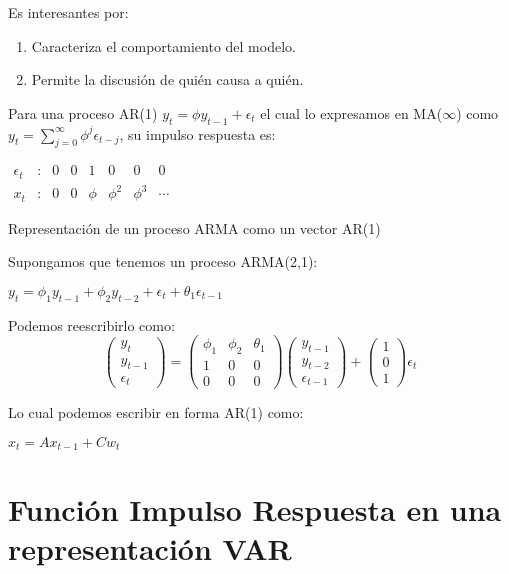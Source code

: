\documentclass[
]{book}
\providecommand{\tightlist}{%
  \setlength{\itemsep}{0pt}\setlength{\parskip}{0pt}}
\begin{document}
Es interesantes por:

\begin{enumerate}
\def\labelenumi{\arabic{enumi}.}
\tightlist
\item
  Caracteriza el comportamiento del modelo.
\item
  Permite la discusión de quién causa a quién.
\end{enumerate}

Para una proceso AR(1) \(y_{t}=\phi y_{t-1}+\epsilon_{t}\) el cual lo expresamos en MA(\(\infty\)) como \(y_{t}=\sum_{j=0}^{\infty}\phi^{j} \epsilon_{t-j}\), su impulso respuesta es:

\(\begin{array}{cccccccc} \epsilon_{t} &\colon &0&0&1&0&0&0 \\ x_{t} &\colon &0&0&\phi&\phi^{2}&\phi^{3}&\cdots \end{array}\)

Representación de un proceso ARMA como un vector AR(1)

Supongamos que tenemos un proceso ARMA(2,1):

\(y_t = \phi_1y_{t-1} + \phi_2y_{t-2} + \epsilon_t + \theta_1\epsilon_{t-1}\)

Podemos reescribirlo como:
\begin{equation}
\left( \begin{array}{c}
y_{t} \\
y_{t-1} \\
\epsilon_{t} 
\end{array}
\right)=\left( \begin{array}{ccc}
\phi_1 & \phi_2 & \theta_1\\
1 & 0 & 0\\
0 & 0 & 0
\end{array}
\right) \left( \begin{array}{c}
y_{t-1} \\
y_{t-2} \\
\epsilon_{t-1} 
\end{array}
\right)+\left( \begin{array}{c}
1\\
0 \\
1
\end{array}
\right) \epsilon_{t} 
\nonumber
\end{equation}

Lo cual podemos escribir en forma AR(1) como:

\(x_t = Ax_{t−1} + Cw_t\)

\hypertarget{funciuxf3n-impulso-respuesta-en-una-representaciuxf3n-var}{%
\section{Función Impulso Respuesta en una representación VAR}\label{funciuxf3n-impulso-respuesta-en-una-representaciuxf3n-var}}
\end{document}
